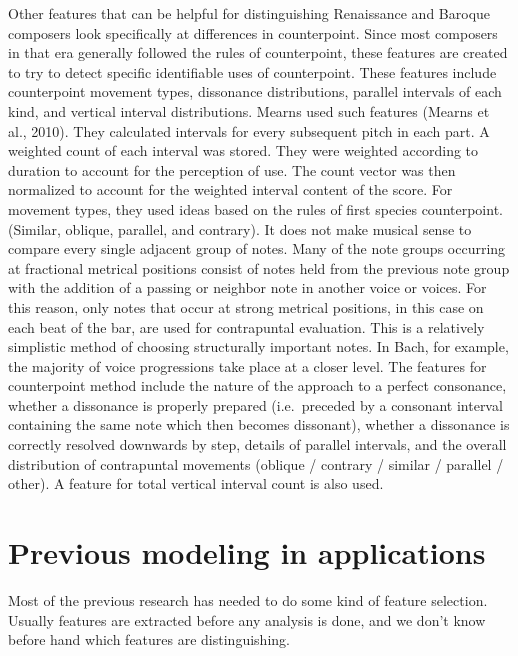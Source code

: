 \documentclass[12pt,twoside]{reedthesis}
\theoremstyle{definition}
\theoremstyle{definition}
\theoremstyle{definition}
\theoremstyle{remark}
\begin{document}
Other features that can be helpful for distinguishing Renaissance and
Baroque composers look specifically at differences in counterpoint.
Since most composers in that era generally followed the rules of
counterpoint, these features are created to try to detect specific
identifiable uses of counterpoint. These features include counterpoint
movement types, dissonance distributions, parallel intervals of each
kind, and vertical interval distributions. Mearns used such features
(Mearns et al., 2010). They calculated intervals for every subsequent
pitch in each part. A weighted count of each interval was stored. They
were weighted according to duration to account for the perception of
use. The count vector was then normalized to account for the weighted
interval content of the score. For movement types, they used ideas based
on the rules of first species counterpoint. (Similar, oblique, parallel,
and contrary). It does not make musical sense to compare every single
adjacent group of notes. Many of the note groups occurring at fractional
metrical positions consist of notes held from the previous note group
with the addition of a passing or neighbor note in another voice or
voices. For this reason, only notes that occur at strong metrical
positions, in this case on each beat of the bar, are used for
contrapuntal evaluation. This is a relatively simplistic method of
choosing structurally important notes. In Bach, for example, the
majority of voice progressions take place at a closer level. The
features for counterpoint method include the nature of the approach to a
perfect consonance, whether a dissonance is properly prepared
(i.e.~preceded by a consonant interval containing the same note which
then becomes dissonant), whether a dissonance is correctly resolved
downwards by step, details of parallel intervals, and the overall
distribution of contrapuntal movements (oblique / contrary / similar /
parallel / other). A feature for total vertical interval count is also
used.

\section{Previous modeling in
applications}\label{previous-modeling-in-applications}

Most of the previous research has needed to do some kind of feature
selection. Usually features are extracted before any analysis is done,
and we don't know before hand which features are distinguishing.
\end{document}
